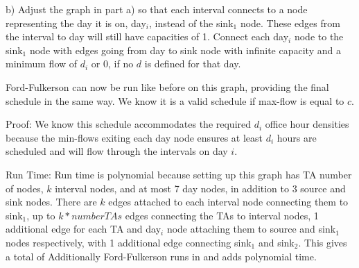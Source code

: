\documentclass[11pt, oneside]{article}
\begin{document}
\bigskip
b) Adjust the graph in part a) so that each interval connects to a node representing the day it is on, day$_i$, instead of the sink$_1$ node. These edges from the interval to day will still have capacities of 1.  Connect each day$_i$ node to the sink$_1$ node with edges going from day to sink node with infinite capacity and a minimum flow of $d_i$ or 0, if no $d$ is defined for that day.

Ford-Fulkerson can now be run like before on this graph, providing the final schedule in the same way. We know it is a valid schedule if max-flow is equal to $c$.

Proof: We know this schedule accommodates the required $d_i$ office hour densities because the min-flows exiting each day node ensures at least $d_i$ hours are scheduled and will flow through the intervals on day $i$.

Run Time: Run time is polynomial because setting up this graph has TA number of nodes, $k$ interval nodes, and at most 7 day nodes, in addition to 3 source and sink nodes. There are $k$ edges attached to each interval node connecting them to sink$_1$, up to $k * numberTAs$ edges connecting the TAs to interval nodes, 1 additional edge for each TA and day$_i$ node attaching them to source and sink$_1$ nodes respectively, with 1 additional edge connecting sink$_1$ and sink$_2$. This gives a total of  Additionally Ford-Fulkerson runs in and adds polynomial time.
\end{document}
